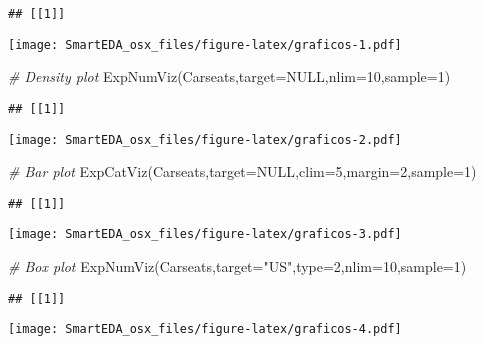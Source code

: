 \documentclass[
]{article}
\newenvironment{Shaded}{\begin{snugshade}}{\end{snugshade}}
\newcommand{\AttributeTok}[1]{\textcolor[rgb]{0.77,0.63,0.00}{#1}}
\newcommand{\CommentTok}[1]{\textcolor[rgb]{0.56,0.35,0.01}{\textit{#1}}}
\newcommand{\ConstantTok}[1]{\textcolor[rgb]{0.00,0.00,0.00}{#1}}
\newcommand{\DecValTok}[1]{\textcolor[rgb]{0.00,0.00,0.81}{#1}}
\newcommand{\FunctionTok}[1]{\textcolor[rgb]{0.00,0.00,0.00}{#1}}
\newcommand{\NormalTok}[1]{#1}
\newcommand{\StringTok}[1]{\textcolor[rgb]{0.31,0.60,0.02}{#1}}
\begin{document}
\begin{verbatim}
## [[1]]
\end{verbatim}

\texttt{[image: SmartEDA\_osx\_files/figure-latex/graficos-1.pdf]}

\begin{Shaded}
\begin{Highlighting}[]
\CommentTok{\# Density plot}
\FunctionTok{ExpNumViz}\NormalTok{(Carseats,}\AttributeTok{target=}\ConstantTok{NULL}\NormalTok{,}\AttributeTok{nlim=}\DecValTok{10}\NormalTok{,}\AttributeTok{sample=}\DecValTok{1}\NormalTok{)}
\end{Highlighting}
\end{Shaded}

\begin{verbatim}
## [[1]]
\end{verbatim}

\texttt{[image: SmartEDA\_osx\_files/figure-latex/graficos-2.pdf]}

\begin{Shaded}
\begin{Highlighting}[]
\CommentTok{\# Bar plot}
\FunctionTok{ExpCatViz}\NormalTok{(Carseats,}\AttributeTok{target=}\ConstantTok{NULL}\NormalTok{,}\AttributeTok{clim=}\DecValTok{5}\NormalTok{,}\AttributeTok{margin=}\DecValTok{2}\NormalTok{,}\AttributeTok{sample=}\DecValTok{1}\NormalTok{)}
\end{Highlighting}
\end{Shaded}

\begin{verbatim}
## [[1]]
\end{verbatim}

\texttt{[image: SmartEDA\_osx\_files/figure-latex/graficos-3.pdf]}

\begin{Shaded}
\begin{Highlighting}[]
\CommentTok{\# Box plot}
\FunctionTok{ExpNumViz}\NormalTok{(Carseats,}\AttributeTok{target=}\StringTok{"US"}\NormalTok{,}\AttributeTok{type=}\DecValTok{2}\NormalTok{,}\AttributeTok{nlim=}\DecValTok{10}\NormalTok{,}\AttributeTok{sample=}\DecValTok{1}\NormalTok{)}
\end{Highlighting}
\end{Shaded}

\begin{verbatim}
## [[1]]
\end{verbatim}

\texttt{[image: SmartEDA\_osx\_files/figure-latex/graficos-4.pdf]}
\end{document}
